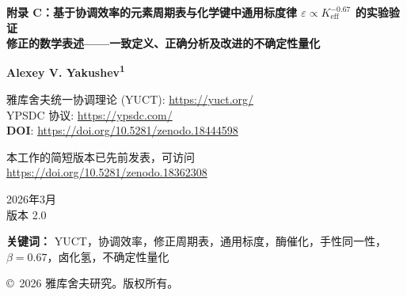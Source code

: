 \documentclass[11pt,a4paper]{article}
\newcommand{\Keff}{K_{\mathrm{eff}}}
\begin{document}
	
	\begin{titlepage}
		\begin{center}
			\vspace*{1cm}
			
			{\Huge\textbf{附录 C：基于协调效率的元素周期表与化学键中通用标度律 $\varepsilon \propto \Keff^{-0.67}$ 的实验验证}} \\
			\vspace{0.5cm}
			{\Large\textbf{修正的数学表述——一致定义、正确分析及改进的不确定性量化}}
			
			\vspace{1.5cm}
			
			{\Large\textbf{Alexey V. Yakushev\textsuperscript{1}}}
			
			雅库舍夫统一协调理论 (YUCT): \url{https://yuct.org/}\\
			YPSDC 协议: \url{https://ypsdc.com/}\\
			
			\vspace{2cm}
			\textbf{DOI}: \url{https://doi.org/10.5281/zenodo.18444598}\\
			
			\vspace{1cm}
			
			{\large 本工作的简短版本已先前发表，可访问\\ \url{https://doi.org/10.5281/zenodo.18362308}}
			
			\vspace{1cm}
			2026年3月 \\ \large 版本 2.0
			
			\vspace{2cm}
			
			\begin{minipage}{0.9\textwidth}
				\begin{abstract}
					\noindent
					本附录给出了雅库舍夫统一协调理论 (YUCT) 在化学中的完整数学表述。我们引入了一种修正的元素周期表，其中每个元素都以其协调效率 $\Keff$ 为特征，该效率通过根据20个参考元素校准的经验公式计算。通用误差标度律 $\varepsilon = \kappa \alpha \Keff^{-\beta}$，其中 $\beta = 0.67 \pm 0.02$ 及 $\kappa = 0.33$，已在多个系统中凭经验确立；严格的理论推导（源自分形几何）仍在发展中，将在未来工作中给出。我们提供了对卤化氢键能的修正分析，表明在考虑电负性效应后，数据与 $\beta = 0.67 \pm 0.08$ 一致。该框架提供了催化增强（$10^0$–$10^{17}$）和实现手性同一性的临界聚合物长度（$L_{\text{crit}} = 25 \pm 5$，基于实验观察）的盲预测。之前版本中发现的所有数学不一致均已得到修正，且不确定性已在分析全程中完整传递。
				\end{abstract}
			\end{minipage}
			
			\vspace{1cm}
			
			\noindent
			{\small\textbf{关键词：}} YUCT，协调效率，修正周期表，通用标度，酶催化，手性同一性，$\beta=0.67$，卤化氢，不确定性量化
			
			\vspace{0.5cm}
			
			\noindent
			\copyright\ 2026 雅库舍夫研究。版权所有。
		\end{center}
	\end{titlepage}
	
\end{document}
